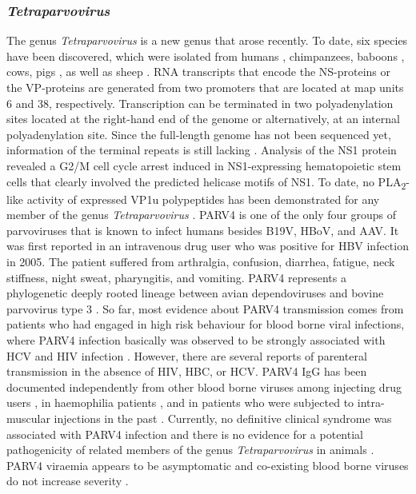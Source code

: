 \subsubsection{\textit{Tetraparvovirus}}
The genus \textit{Tetraparvovirus} is a new genus that arose recently. To date, six species have been discovered, which were isolated from humans \cite{pmid15956568}, chimpanzees, baboons \cite{pmid20668071}, cows, pigs \cite{pmid18632954, pmid20653980, pmid22247522}, as well as sheep \cite{pmid21980506}. RNA transcripts that encode the NS-proteins or the VP-proteins are generated from two promoters that are located at map units 6 and 38, respectively. Transcription can be terminated in two polyadenylation sites located at the right-hand end of the genome or alternatively, at an internal polyadenylation site. Since the full-length genome has not been sequenced yet, information of the terminal repeats is still lacking \cite{pmid22044541}. Analysis of the NS1 protein revealed a G2/M cell cycle arrest induced in NS1-expressing hematopoietic stem cells that clearly involved the predicted helicase motifs \cite{pmid8106366, pmid9261429, pmid7966641} of NS1. To date, no PLA\textsubscript{2}-like activity of expressed VP1u polypeptides has been demonstrated for any member of the genus \textit{Tetraparvovirus} \cite{pmid22044541}. PARV4 is one of the only four groups of parvoviruses that is known to infect humans besides B19V, HBoV, and AAV. It was first reported in an intravenous drug user who was positive for HBV infection in 2005. The patient suffered from arthralgia, confusion, diarrhea, fatigue, neck stiffness, night sweat, pharyngitis, and vomiting. PARV4 represents a phylogenetic deeply rooted lineage between avian dependoviruses and bovine parvovirus type 3 \cite{pmid15956568}. So far, most evidence about PARV4 transmission comes from patients who had engaged in high risk behaviour for blood borne viral infections, where PARV4 infection basically was observed to be strongly associated with HCV and HIV infection \cite{pmid22492853, pmid22235298, pmid17397006}. However, there are several reports of parenteral transmission in the absence of HIV, HBC, or HCV. PARV4 IgG has been documented independently from other blood borne viruses among injecting drug users \cite{pmid23283958}, in haemophilia patients \cite{pmid22043925}, and in patients who were subjected to intra-muscular injections in the past \cite{pmid22469425}. Currently, no definitive clinical syndrome was associated with PARV4 infection and there is no evidence for a potential pathogenicity of related members of the genus \textit{Tetraparvovirus} in animals \cite{pmid18632954}. PARV4 viraemia appears to be asymptomatic \cite{pmid20587191} and co-existing blood borne viruses do not increase severity \cite{pmid22235298}.   

